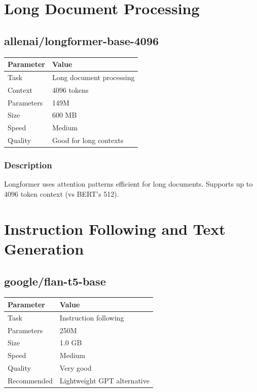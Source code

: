 \documentclass[12pt,a4paper]{report}
\begin{document}
\section{Long Document Processing}

\subsection{allenai/longformer-base-4096}

\begin{tabular}{|p{3cm}|p{11cm}|}
\hline
\textbf{Parameter} & \textbf{Value} \\
\hline
Task & Long document processing \\
\hline
Context & 4096 tokens \\
\hline
Parameters & 149M \\
\hline
Size & 600 MB \\
\hline
Speed & Medium \\
\hline
Quality & Good for long contexts \\
\hline
\end{tabular}

\subsubsection{Description}

Longformer uses attention patterns efficient for long documents. Supports up to 4096 token context (vs BERT's 512).

\section{Instruction Following and Text Generation}

\subsection{google/flan-t5-base}

\begin{tabular}{|p{3cm}|p{11cm}|}
\hline
\textbf{Parameter} & \textbf{Value} \\
\hline
Task & Instruction following \\
\hline
Parameters & 250M \\
\hline
Size & 1.0 GB \\
\hline
Speed & Medium \\
\hline
Quality & Very good \\
\hline
Recommended & Lightweight GPT alternative \\
\hline
\end{tabular}
\end{document}
